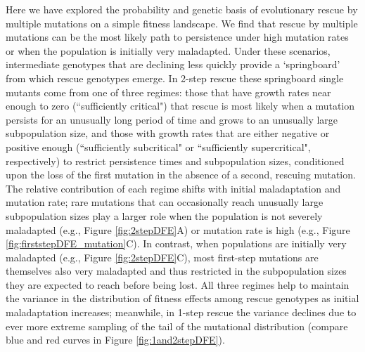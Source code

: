 \documentclass[9pt,twocolumn,twoside,lineno]{gsajnl}
\begin{document}
Here we have explored the probability and genetic basis of evolutionary rescue by multiple mutations on a simple fitness landscape. 
We find that rescue by multiple mutations can be the most likely path to persistence under high mutation rates or when the population is initially very maladapted.
Under these scenarios, intermediate genotypes that are declining less quickly provide a `springboard' from which rescue genotypes emerge.
In 2-step rescue these springboard single mutants come from one of three regimes: those that have growth rates near enough to zero (``sufficiently critical") that rescue is most likely when a mutation persists for an unusually long period of time and grows to an unusually large subpopulation size, and those with growth rates that are either negative or positive enough (``sufficiently subcritical" or ``sufficiently supercritical", respectively) to restrict persistence times and subpopulation sizes, conditioned upon the loss of the first mutation in the absence of a second, rescuing mutation.
The relative contribution of each regime shifts with initial maladaptation and mutation rate; rare mutations that can occasionally reach unusually large subpopulation sizes play a larger role when the population is not severely maladapted (e.g., Figure \ref{fig:2stepDFE}A) or mutation rate is high (e.g., Figure \ref{fig:firststepDFE_mutation}C).
In contrast, when populations are initially very maladapted (e.g., Figure \ref{fig:2stepDFE}C), most first-step mutations are themselves also very maladapted and thus restricted in the subpopulation sizes they are expected to reach before being lost.     
All three regimes help to maintain the variance in the distribution of fitness effects among rescue genotypes as initial maladaptation increases; meanwhile, in 1-step rescue the variance declines due to ever more extreme sampling of the tail of the mutational distribution (compare blue and red curves in Figure \ref{fig:1and2stepDFE}).
\end{document}
